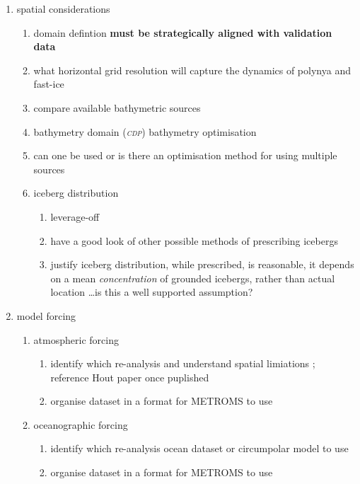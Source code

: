 \documentclass[11pt,a4paper]{article}
\newcommand{\cdp}{\textit{\textsc{{cdp}}}} %
\begin{document}
\begin{enumerate}
\begin{enumerate}
\begin{enumerate}
\begin{enumerate}
      \item timesteps must be consistent with capturing dynamic processes; on the order of minutes, but
      \end{enumerate}
    \item spatial considerations
      \begin{enumerate}
      \item domain defintion \textbf{must be strategically aligned with validation data}
      \item what horizontal grid resolution will capture the dynamics of polynya and fast-ice
      \item compare available bathymetric sources
      \item bathymetry domain (\cdp) bathymetry optimisation
      \item can one be used or is there an optimisation method for using multiple sources
      \item iceberg distribution
        \begin{enumerate}
        \item leverage-off \cite{VanAchter2021}
        \item have a good look of other possible methods of prescribing icebergs
        \item justify iceberg distribution, while prescribed, is reasonable, it depends on a mean \textit{concentration} of grounded icebergs, rather than actual location \ldots is this a well supported assumption?
        \end{enumerate}
      \end{enumerate}
    \item model forcing
      \begin{enumerate}
      \item atmospheric forcing
        \begin{enumerate}
        \item identify which re-analysis and understand spatial limiations ; reference Hout paper once puplished
        \item organise dataset in a format for METROMS to use
        \end{enumerate}
      \item oceanographic forcing
        \begin{enumerate}
        \item identify which re-analysis ocean dataset or circumpolar model to use
        \item organise dataset in a format for METROMS to use

\end{enumerate}
\end{enumerate}
\end{enumerate}
\end{enumerate}
\end{enumerate}
\end{document}
